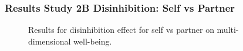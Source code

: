 \documentclass[
  singlecolumn]{article}
\begin{document}
\newpage{}

\subsubsection{Results Study 2B Disinhibition: Self vs
Partner}\label{results-study-2b-disinhibition-self-vs-partner}

\begin{figure}


\caption{\label{fig-results-disinhibition-self}Results for disinhibition
effect for self vs partner on multi-dimensional well-being.}

\end{figure}%

\newpage{}
\end{document}
